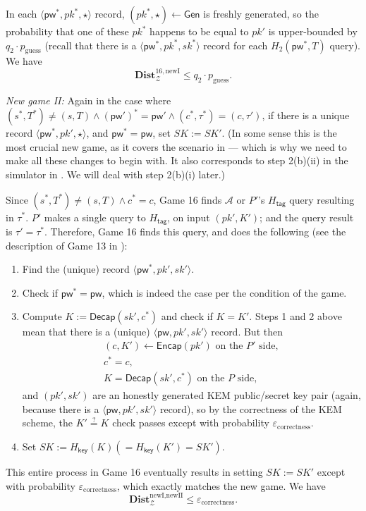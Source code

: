 \documentclass{article}
\theoremstyle{plain}
\theoremstyle{definition}
\theoremstyle{remark}
\newcommand{\adv}{\mathcal{A}}
\newcommand{\env}{\mathcal{Z}}
\newcommand{\Dist}{\mathbf{Dist}}
\newcommand{\Gen}{\mathsf{Gen}}
\newcommand{\Encap}{\mathsf{Encap}}
\newcommand{\Decap}{\mathsf{Decap}}
\newcommand{\Hkey}{H_\mathsf{key}}
\newcommand{\Htag}{H_\mathsf{tag}}
\newcommand{\pw}{\mathsf{pw}}
\begin{document}
In each $\langle\pw^*,pk^*,\star\rangle$ record, $(pk^*,\star) \gets \Gen$ is freshly generated, so the probability that one of these $pk^*$ happens to be equal to $pk'$ is upper-bounded by $q_2 \cdot p_\text{guess}$ (recall that there is a $\langle\pw^*,pk^*,sk^*\rangle$ record for each $H_2(\pw^*,T)$ query). We have
\[
\Dist_\env^{16,\text{newI}} \leq q_2 \cdot p_\text{guess}.
\]

\medskip\noindent\emph{New game II:} Again in the case where $(s^*,T^*) \neq (s,T) \land (\pw')^* = \pw' \land (c^*,\tau^*) = (c,\tau')$, if there is a unique record $\langle\pw^*,pk',\star\rangle$, and $\pw^* = \pw$, set $SK := SK'$. (In some sense this is the most crucial new game, as it covers the scenario in  --- which is why we need to make all these changes to begin with. It also corresponds to step 2(b)(ii) in the simulator in . We will deal with step 2(b)(i) later.)

Since $(s^*,T^*) \neq (s,T) \land c^* = c$, Game 16 finds $\adv$ or $P'$'s $\Htag$ query resulting in $\tau^*$. $P'$ makes a single query to $\Htag$, on input $(pk',K')$; and the query result is $\tau' = \tau^*$. Therefore, Game 16 finds this query, and does the following (see the description of Game 13 in ):
\begin{enumerate}
  \item Find the (unique) record $\langle\pw^*,pk',sk'\rangle$.
  \item Check if $\pw^* = \pw$, which is indeed the case per the condition of the game.
  \item Compute $K := \Decap(sk',c^*)$ and check if $K = K'$. Steps 1 and 2 above mean that there is a (unique) $\langle\pw,pk',sk'\rangle$ record. But then
      \begin{gather*}
      (c,K') \gets \Encap(pk')\text{ on the }P'\text{ side}, \\
      c^* = c, \\
      K = \Decap(sk',c^*)\text{ on the }P\text{ side},
      \end{gather*}
      and $(pk',sk')$ are an honestly generated KEM public/secret key pair (again, because there is a $\langle\pw,pk',sk'\rangle$ record), so by the correctness of the KEM scheme, the $K' \stackrel{?}{=} K$ check passes except with probability $\varepsilon_\text{correctness}$.
  \item Set $SK := \Hkey(K) (= \Hkey(K') = SK')$.
\end{enumerate}
This entire process in Game 16 eventually results in setting $SK := SK'$ except with probability $\varepsilon_\text{correctness}$, which exactly matches the new game. We have
\[
\Dist_\env^{\text{newI},\text{newII}} \leq \varepsilon_\text{correctness}.
\]
\end{document}

